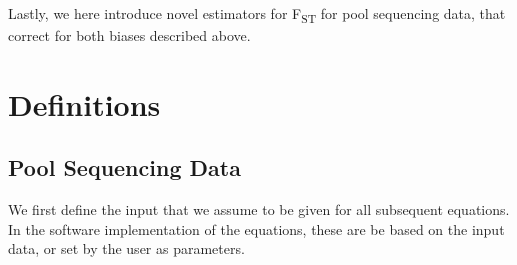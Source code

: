 \documentclass[a4paper,9pt,DIV=14]{scrartcl}
\newcounter{todo}
\newcommand\todo[1]{}
\newcommand{\fst}{F\textsubscript{ST}}
\newcommand\citeay[1]{\citeauthor{#1} (\citeyear{#1}) \cite{#1}}
\begin{document}
Lastly, we here introduce novel estimators for \fst{} for pool sequencing data, that correct for both biases described above.


{}



\section{Definitions}
\label{supp:sec:Definitions}



\subsection{Pool Sequencing Data}
\label{supp:sec:Definitions:sub:PoolSequencing}

We first define the input that we assume to be given for all subsequent equations.
In the software implementation of the equations, these are be based on the input data, or set by the user as parameters.
\end{document}
